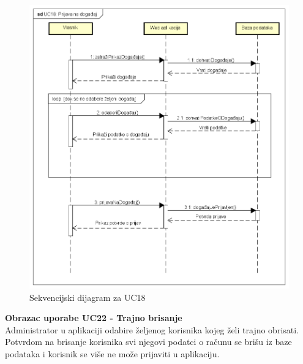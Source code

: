 				\begin{figure}[H]
					\includegraphics[scale=0.5]{slike/UC18.PNG} %
					\centering
					\caption{Sekvencijski dijagram za UC18}
				\end{figure}
				
				\pagebreak
				\textbf{Obrazac uporabe UC22 - Trajno brisanje}\\
				\indent Administrator u aplikaciji odabire željenog korisnika kojeg želi trajno obrisati. Potvrdom na brisanje korisnika svi njegovi podatci o računu se brišu iz baze podataka i korisnik se više ne može prijaviti u aplikaciju.
				

